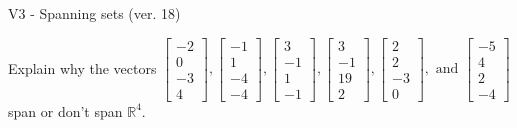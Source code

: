 \begin{exercise}
  \begin{exerciseTitle}V3 - Spanning sets (ver. 18)\end{exerciseTitle}
  \begin{exerciseStatement}
    Explain why the vectors \(\left[\begin{array}{r}
-2 \\
0 \\
-3 \\
4
\end{array}\right] , \left[\begin{array}{r}
-1 \\
1 \\
-4 \\
-4
\end{array}\right] , \left[\begin{array}{r}
3 \\
-1 \\
1 \\
-1
\end{array}\right] , \left[\begin{array}{r}
3 \\
-1 \\
19 \\
2
\end{array}\right] , \left[\begin{array}{r}
2 \\
2 \\
-3 \\
0
\end{array}\right] , \text{ and } \left[\begin{array}{r}
-5 \\
4 \\
2 \\
-4
\end{array}\right]\) span or don't span \(\mathbb{R}^4\). 
	



\end{exerciseStatement}
\end{exercise}
